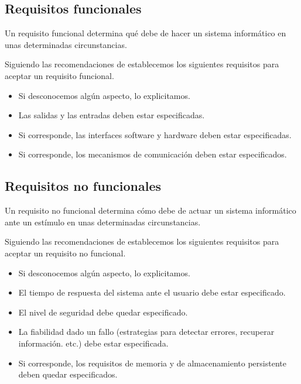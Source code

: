 \subsection{Requisitos funcionales}

Un requisito funcional determina qué debe de hacer un sistema informático en unas determinadas circunstancias.

Siguiendo las recomendaciones de \cite[Checklist: Requirements]{CodeComplete2} establecemos
los siguientes requisitos para aceptar un requisito funcional.

\begin{itemize}[noitemsep,nolistsep]
    \item Si desconocemos algún aspecto, lo explicitamos.
    \item Las salidas y las entradas deben estar especificadas.
    \item Si corresponde, las interfaces software y hardware deben
          estar especificadas.
    \item Si corresponde, los mecanismos de comunicación deben estar
          especificados.
\end{itemize}

\subsection{Requisitos no funcionales}

Un requisito no funcional determina cómo debe de actuar un sistema informático ante un estímulo en unas determinadas circunstancias.

Siguiendo las recomendaciones de \cite[Checklist: Requirements]{CodeComplete2} establecemos
los siguientes requisitos para aceptar un requisito no funcional. 

\begin{itemize}[noitemsep,nolistsep]
    \item Si desconocemos algún aspecto, lo explicitamos.
    \item El tiempo de respuesta del sistema ante el usuario debe estar especificado.
    \item El nivel de seguridad debe quedar especificado.
    \item La fiabilidad dado un fallo (estrategias para detectar errores, recuperar información. etc.) debe estar especificada.
    \item Si corresponde, los requisitos de memoria y de almacenamiento persistente deben quedar especificados.
\end{itemize}

